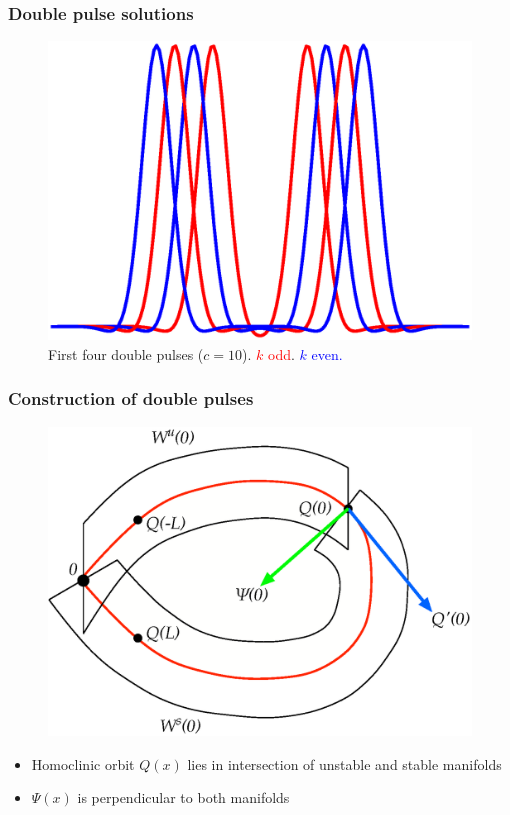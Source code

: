 \documentclass[16pt]{beamer}
\begin{document}
\begin{frame}
	\frametitle{Double pulse solutions}
	\fontsize{16}{7.2}\selectfont
	\begin{figure}
	\begin{center}
	\includegraphics[width=0.7\linewidth]{images/first4dp}
	\end{center}
	\caption{First four double pulses ($c = 10$). \textcolor{red}{$k$ odd}. \textcolor{blue}{$k$ even. } }
	\end{figure}
\end{frame}

\begin{frame}
	\frametitle{Construction of double pulses}
	\fontsize{16}{7.2}\selectfont
	\begin{figure}
	\begin{center}
	\includegraphics[width=0.6\linewidth]{images/WsWu}
	\end{center}
	\end{figure}
	\begin{itemize}
		\item Homoclinic orbit $Q(x)$ lies in intersection of unstable and stable manifolds
		\item $\Psi(x)$ is perpendicular to both manifolds
	\end{itemize}
\end{frame}
\end{document}
